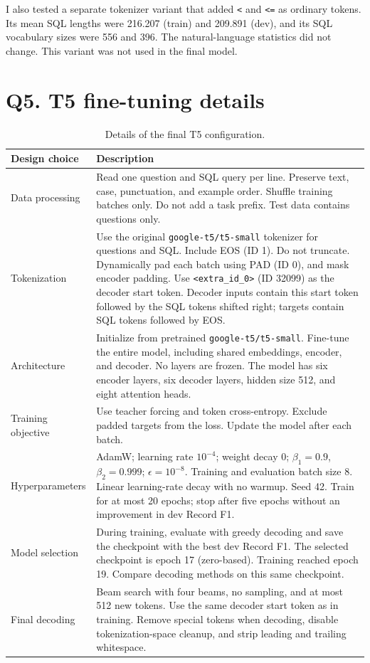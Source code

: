 \documentclass[11pt]{article}
\begin{document}
I also tested a separate tokenizer variant that added \texttt{<} and \texttt{<=} as ordinary tokens. Its mean SQL lengths were 216.207 (train) and 209.891 (dev), and its SQL vocabulary sizes were 556 and 396. The natural-language statistics did not change. This variant was not used in the final model.

\newpage
\section{Q5. T5 fine-tuning details}
\begin{table}[h]\centering\small
\renewcommand{\arraystretch}{1.15}
\begin{tabularx}{\textwidth}{p{}Y}\toprule
Design choice & Description\\\midrule
Data processing & Read one question and SQL query per line. Preserve text, case, punctuation, and example order. Shuffle training batches only. Do not add a task prefix. Test data contains questions only.\\
Tokenization & Use the original \texttt{google-t5/t5-small} tokenizer for questions and SQL. Include EOS (ID 1). Do not truncate. Dynamically pad each batch using PAD (ID 0), and mask encoder padding. Use \texttt{<extra\_id\_0>} (ID 32099) as the decoder start token. Decoder inputs contain this start token followed by the SQL tokens shifted right; targets contain SQL tokens followed by EOS.\\
Architecture & Initialize from pretrained \texttt{google-t5/t5-small}. Fine-tune the entire model, including shared embeddings, encoder, and decoder. No layers are frozen. The model has six encoder layers, six decoder layers, hidden size 512, and eight attention heads.\\
Training objective & Use teacher forcing and token cross-entropy. Exclude padded targets from the loss. Update the model after each batch.\\
Hyperparameters & AdamW; learning rate $10^{-4}$; weight decay 0; $\beta_1=0.9$, $\beta_2=0.999$; $\epsilon=10^{-8}$. Training and evaluation batch size 8. Linear learning-rate decay with no warmup. Seed 42. Train for at most 20 epochs; stop after five epochs without an improvement in dev Record F1.\\
Model selection & During training, evaluate with greedy decoding and save the checkpoint with the best dev Record F1. The selected checkpoint is epoch 17 (zero-based). Training reached epoch 19. Compare decoding methods on this same checkpoint.\\
Final decoding & Beam search with four beams, no sampling, and at most 512 new tokens. Use the same decoder start token as in training. Remove special tokens when decoding, disable tokenization-space cleanup, and strip leading and trailing whitespace.\\\bottomrule
\end{tabularx}
\caption{Details of the final T5 configuration.}
\end{table}
\end{document}
